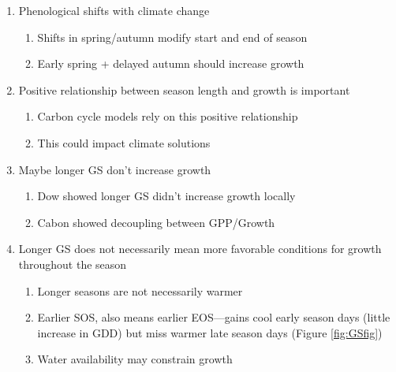 \begin{enumerate}

\item Phenological shifts with climate change
  \begin{enumerate}
  
  \item Shifts in spring/autumn modify start and end of season \citep{parmesan_globally_2003,cleland_shifting_2007,lieth_phenology_1974,woolway_phenological_2021,menzel_european_2006}
  
  \item Early spring + delayed autumn should increase growth
  
  \end{enumerate}
  
\item Positive relationship between season length and growth is important
  \begin{enumerate}
  \item Carbon cycle models rely on this positive relationship
  
  \item This could impact climate solutions 
  
  \end{enumerate}

\item Maybe longer GS don't increase growth
  \begin{enumerate}
  
  \item Dow showed longer GS didn't increase growth locally
  
  \item Cabon showed decoupling between GPP/Growth
  
  \end{enumerate}

\item Longer GS does not necessarily mean more favorable conditions for growth throughout the season
  \begin{enumerate}
  
  \item Longer seasons are not necessarily warmer
  
  \item Earlier SOS, also means earlier EOS---gains cool early season days (little increase in GDD) but miss warmer late season days (Figure \ref{fig:GSfig})
  
  \item Water availability may constrain growth
  

\end{enumerate}
\end{enumerate}
